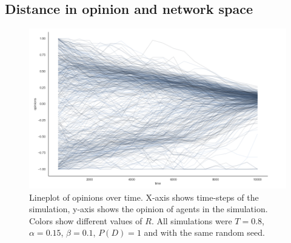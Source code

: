 \documentclass{article}
\begin{document}
\subsection{Distance in opinion and network space}
\begin{figure}[H]
    \centering
    \includegraphics[width=.8\linewidth]{../plots/example/Lineplot_Over_Time.png}
  \caption{Lineplot of opinions over time. X-axis shows time-steps of the simulation, y-axis shows the opinion of agents in the simulation. Colors show different values of $R$. All simulations were $T = 0.8$, $\alpha = 0.15$, $\beta = 0.1$, $P(D) = 1$ and with the same random seed.}
  \label{fig:lineplot}
\end{figure}
\end{document}
